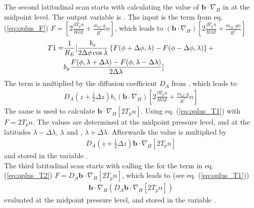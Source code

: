 %
The second latitudinal scan starts with calculating the value of
$\mathbf{b} \cdot \nabla_H$ in  at the
midpoint level. The output variable is . The input
is the term from eq. (\ref{eq:oplus_F}) $F = \left[2  \frac{\partial
T_p n}{H
\partial Z} + \frac{m_{O^+}  g}{R^*} n \right] $, which leads to
$( \mathbf{b} \cdot \nabla_H ) \left[2  \frac{\partial T_p n}{H
\partial Z} + \frac{m_{O^+}  g n}{R^*} \right] $
%
\begin{align}
  T1 = & \frac{1}{R_E} [ \frac{b_x}{2 \Delta \phi  \cos \lambda }
  \left\{
   F(\phi+ \Delta \phi, \lambda) - F(\phi- \Delta \phi, \lambda)\right\}
   + \notag \\
   {} & b_y \frac{F(\phi, \lambda+ \Delta \lambda) -
   F(\phi, \lambda- \Delta \lambda)}{2 \Delta \lambda}]
   \label{eq:oplus_T1}
\end{align}
%
The term is multiplied by the diffusion coefficient $D_A$ from
, which leads to
%
\begin{align}
  D_A(z+\frac{1}{2} \Delta z) b_z ( \mathbf{b} \cdot \nabla_H ) \left[2 \frac{\partial T_p n}{H
\partial Z} + \frac{m_{O^+}  g }{R^*} n \right] \label{eq:oplus_T1b}
\end{align}
%
The same  is used to calculate $\mathbf{b}
\cdot \nabla_H \left[ 2 T_p n \right]$. Using eq.
(\ref{eq:oplus_T1}) with $F = 2 T_p n$. The values are determined at
the midpoint pressure level, and at the latitudes $\lambda - \Delta
\lambda$, $\lambda$ and , $\lambda + \Delta \lambda$. Afterwards the
value is multiplied by
%
\begin{align}
  D_A(z+\frac{1}{2} \Delta z) \mathbf{b} \cdot \nabla_H \left[ 2 T_p n \right]
  \label{eq:oplus_T2}
\end{align}
%
and stored in the variable . \\

%
The third latitudinal scan starts with calling the  for the term in eq. (\ref{eq:oplus_T2}) $F= D_A \mathbf{b}
\cdot \nabla_H \left[ 2 T_p n \right]$, which leads to (see eq.
(\ref{eq:oplus_T1}))
%
\begin{align}
  \mathbf{b}
\cdot \nabla_H \left( D_A \mathbf{b} \cdot \nabla_H \left[ 2 T_p n
\right] \right)
\end{align}
%
evaluated at the midpoint pressure level, and stored in the variable
. \\

